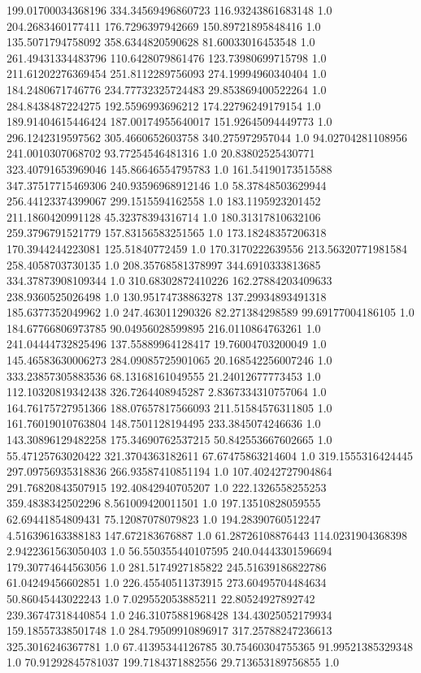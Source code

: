 199.01700034368196	334.34569496860723	116.93243861683148	1.0
204.2683460177411	176.7296397942669	150.89721895848416	1.0
135.5071794758092	358.6344820590628	81.60033016453548	1.0
261.49431334483796	110.6428079861476	123.73980699715798	1.0
211.61202276369454	251.8112289756093	274.19994960340404	1.0
184.2480671746776	234.77732325724483	29.853869400522264	1.0
284.8438487224275	192.5596993696212	174.22796249179154	1.0
189.91404615446424	187.00174955640017	151.92645094449773	1.0
296.1242319597562	305.4660652603758	340.275972957044	1.0
94.02704281108956	241.0010307068702	93.77254546481316	1.0
20.83802525430771	323.40791653969046	145.86646554795783	1.0
161.54190173515588	347.37517715469306	240.93596968912146	1.0
58.37848503629944	256.44123374399067	299.1515594162558	1.0
183.1195923201452	211.1860420991128	45.32378394316714	1.0
180.31317810632106	259.3796791521779	157.83156583251565	1.0
173.18248357206318	170.3944244223081	125.51840772459	1.0
170.3170222639556	213.56320771981584	258.4058703730135	1.0
208.35768581378997	344.6910333813685	334.37873908109344	1.0
310.68302872410226	162.27884203409633	238.9360525026498	1.0
130.95174738863278	137.29934893491318	185.6377352049962	1.0
247.463011290326	82.271384298589	99.69177004186105	1.0
184.67766806973785	90.04956028599895	216.0110864763261	1.0
241.04444732825496	137.55889964128417	19.76004703200049	1.0
145.46583630006273	284.09085725901065	20.168542256007246	1.0
333.23857305883536	68.13168161049555	21.24012677773453	1.0
112.10320819342438	326.7264408945287	2.8367334310757064	1.0
164.76175727951366	188.07657817566093	211.51584576311805	1.0
161.76019010763804	148.7501128194495	233.3845074246636	1.0
143.30896129482258	175.34690762537215	50.842553667602665	1.0
55.47125763020422	321.3704363182611	67.67475863214604	1.0
319.1555316424445	297.09756935318836	266.93587410851194	1.0
107.40242727904864	291.76820843507915	192.40842940705207	1.0
222.1326558255253	359.4838342502296	8.561009420011501	1.0
197.13510828059555	62.69441854809431	75.12087078079823	1.0
194.28390760512247	4.516396163388183	147.672183676887	1.0
61.28726108876443	114.0231904368398	2.9422361563050403	1.0
56.550355440107595	240.04443301596694	179.30774644563056	1.0
281.5174927185822	245.51639186822786	61.04249456602851	1.0
226.45540511373915	273.60495704484634	50.86045443022243	1.0
7.029552053885211	22.80524927892742	239.36747318440854	1.0
246.31075881968428	134.43025052179934	159.18557338501748	1.0
284.79509910896917	317.25788247236613	325.3016246367781	1.0
67.41395344126785	30.75460304755365	91.99521385329348	1.0
70.91292845781037	199.7184371882556	29.713653189756855	1.0
